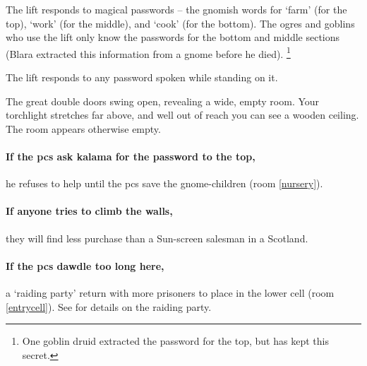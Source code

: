 \begin{multicols}{2}
The lift responds to magical passwords -- the gnomish words for `farm' (for the top), `work' (for the middle), and `cook' (for the bottom).
The \glspl{ogre} and goblins who use the lift only know the passwords for the bottom and middle sections (Blara extracted this information from a gnome before he died).%
\footnote{One goblin druid extracted the password for the top, but has kept this secret.}

The lift responds to any password spoken while standing on it.

\begin{boxtext}
  The great double doors swing open, revealing a wide, empty room.
  Your torchlight stretches far above, and well out of reach you can see a wooden ceiling.
  The room appears otherwise empty.
\end{boxtext}

\paragraph{If the \glspl{pc} ask \gls{kalama} for the password to the top,}
he refuses to help until the \glspl{pc} save the gnome-children (room \vref{nursery}).

\paragraph{If anyone tries to climb the walls,}
they will find less purchase than a Sun-screen salesman in a Scotland.

\paragraph{If the \glspl{pc} dawdle too long here,}
a `raiding party' return with more prisoners to place in the lower cell (room \ref{entrycell}).
See  for details on the raiding party.



\end{multicols}
